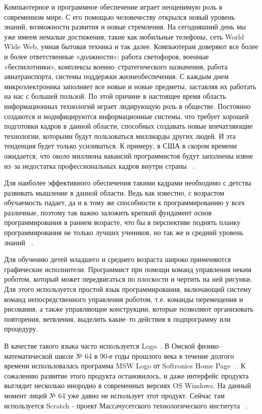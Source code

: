 Компьютерное и программное обеспечение  играет неоценимую роль в современном мире. С его помощью человечеству открылся новый уровень знаний, возможности развития и новые стремления. На сегодняшний день мы уже имеем немалые достижения, такие как мобильные телефоны, сеть World Wide Web, умная бытовая техника и так далее. Компьютерам доверяют все более и более ответственные «должности»: работа светофоров, военные «беспилотники», комплексы военно–стратегического назначения, работа авиатранспорта, системы поддержки жизнеобеспечения. С каждым днем микроэлектроника заполняет все новые и новые предметы, заставляя их работать на нас с большей пользой. По этой причине в настоящее время область информационных технологий играет лидирующую роль в обществе. Постоянно создаются и модифицируются информационные системы, что требует хорошей подготовки кадров в данной области, способных создавать новые впечатляющие технологии, которыми будут пользоваться миллиарды других людей. И эта тенденция будет только усиливаться. К примеру, в США в скором времени ожидается, что около миллиона вакансий программистов будут заполнены извне из–за недостатка профессиональных кадров внутри страны ~\cite{almanah,viborprofessii}.\par
 Для наиболее эффективного обеспечения такими кадрами необходимо с детства развивать мышление в данной области. Ведь как известно, с возрастом обучаемость падает, да и к тому же способности к программированию у всех различные, поэтому так важно заложить крепкий фундамент основ программирования в раннем возрасте, что бы в перспективе поднять планку программирования не только лучших учеников, но так же и средний уровень знаний ~\cite{izuchayteprogr}.\par
Для обучению детей младшего и среднего возраста широко применяются графические исполнители. Программист при помощи команд управления неким роботом, который может передвигаться по плоскости и чертить на ней рисунки. Для этого используется простой язык программирования, включающий систему команд непосредственного управления роботом, т.е. команды перемещения и рисования, а также управляющие конструкции, которые позволяют организовать повторения, ветвления, выделить какие–то действия в подпрограмму или процедуру.\par
В качестве такого языка часто используется Logo~\cite{shaposhnicow}. В Омской физико–математической школе № 64 в 90-е годы прошлого века в течение долгого времени использовалась программа MSW Logo от Softronics Home Page ~\cite{logo}. К сожалению развитие этого продукта остановилось, и даже интерфейс продукта выглядит несколько инородно в современных версиях OS Windows. На данный момент лицей № 64 уже давно не использует этот продукт. Сейчас там используется Scratch - проект Массачусетского технологического института ~\cite{scratch}.\par
